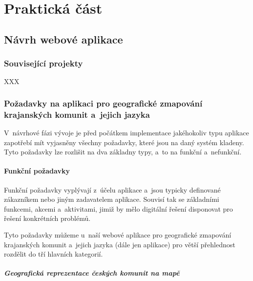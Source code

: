 \part{Praktická část}

\hypertarget{nuxe1vrh-webovuxe9-aplikace}{%
\chapter{Návrh webové aplikace}\label{nuxe1vrh-webovuxe9-aplikace}}

\hypertarget{souvisejuxedcuxed-projekty}{%
\section{Související projekty}\label{souvisejuxedcuxed-projekty}}

XXX

\hypertarget{poux17eadavky-na-aplikaci-pro-geografickuxe9-zmapovuxe1nuxed-krajanskuxfdch-komunit-a-jejich-jazyka}{%
\section{Požadavky na aplikaci pro geografické zmapování krajanských komunit a~jejich jazyka}\label{poux17eadavky-na-aplikaci-pro-geografickuxe9-zmapovuxe1nuxed-krajanskuxfdch-komunit-a-jejich-jazyka}}

V~návrhové fázi vývoje je před počátkem implementace jakéhokoliv typu aplikace zapotřebí mít vyjasněny všechny požadavky, které jsou na daný systém kladeny. Tyto požadavky lze rozlišit na dva základny typy, a~to na funkční a~nefunkční.

\hypertarget{funkux10dnuxed-poux17eadavky}{%
\subsection{Funkční požadavky}\label{funkux10dnuxed-poux17eadavky}}

Funkční požadavky vyplývají z~účelu aplikace a~jsou typicky definované zákazníkem nebo jiným zadavatelem aplikace. Souvisí tak se základními funkcemi, akcemi a~aktivitami, jimiž by mělo digitální řešení disponovat pro řešení konkrétních problémů\parencite{Gorton2006}.

Tyto požadavky můžeme u~naší webové aplikace pro geografické zmapování krajanských komunit a~jejich jazyka (dále jen aplikace) pro větší přehlednost rozdělit do tří hlavních kategorií.

\hypertarget{geografickuxe1-reprezentace-ux10deskuxfdch-komunit-na-mapux11b}{%
\subsubsection*{Geografická reprezentace českých komunit na mapě}\label{geografickuxe1-reprezentace-ux10deskuxfdch-komunit-na-mapux11b}}

